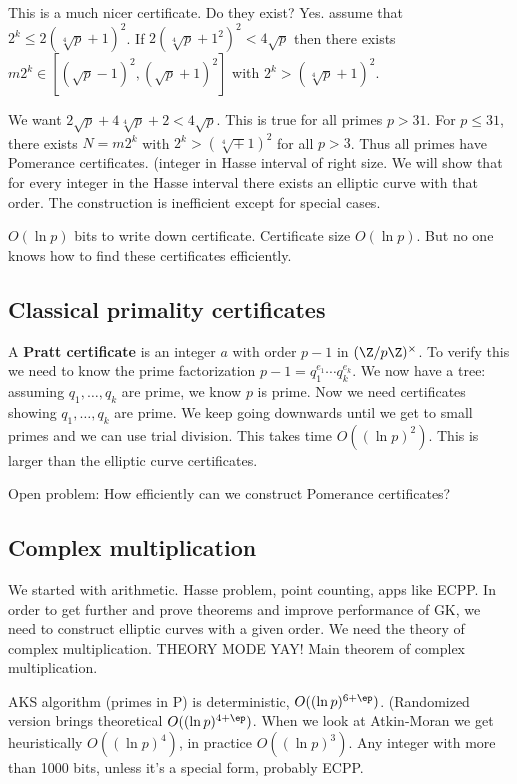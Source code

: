 This is a much nicer certificate. Do they exist? Yes. \Wog{} assume that $2^k\le 2(\sqrt[4]{p}+1)^2$. If $2(\sqrt[4]p+1^2)^2<4\sqrt p$ then there exists $m2^k\in [(\sqrt p-1)^2,(\sqrt p+1)^2]$ with $2^k>(\sqrt[4]p+1)^2$.

We want $2\sqrt p+4\sqrt[4]p+2<4\sqrt p$. This is true for all primes $p>31$. For $p\le 31$, there exists $N=m2^k$ with $2^k>(\sqrt[4]+1)^2$ for all $p>3$. Thus all primes  have Pomerance certificates. (integer in Hasse interval of right size. We will show that for every integer in the Hasse interval there exists an elliptic curve with that order. The construction is inefficient except for special cases.

$O(\ln p)$ bits to write down certificate. Certificate size $O(\ln p)$. But no one knows how to find these certificates efficiently.

\subsection{Classical primality certificates}
A \textbf{Pratt certificate} is an integer $a$ with order $p-1$ in $(\Z/p\Z)^{\times}$. To verify this we need to know the prime factorization $p-1=q_1^{e_1}\cdots q_k^{e_k}$. We now have a tree: assuming $q_1,\ldots, q_k$ are prime, we know $p$ is prime. Now we need certificates showing $q_1,\ldots, q_k$ are prime. We keep going downwards until we get to small primes and we can use trial division. This takes time $O((\ln p)^2)$. This is larger than the elliptic curve certificates.

Open problem: How efficiently can we construct Pomerance certificates?
\subsection{Complex multiplication}
We started with arithmetic. Hasse problem, point counting, apps like ECPP. In order to get further and prove theorems 
and improve performance of GK, we need to construct elliptic curves with a given order. We need the theory of complex multiplication. THEORY MODE YAY!
Main theorem of complex multiplication.

AKS algorithm (primes in P) is deterministic, $O((\ln p)^{6+\ep})$. (Randomized version brings theoretical $O((\ln p)^{4+\ep})$. 
When we look at Atkin-Moran we get heuristically $O((\ln p)^4)$, in practice $O((\ln p)^3)$. Any integer with more than 1000 bits, unless it's a special form, probably ECPP. 

